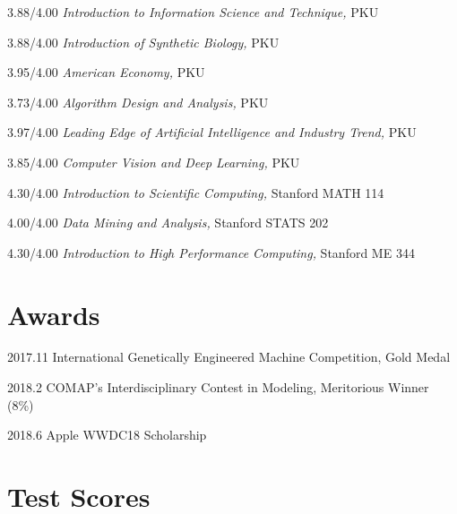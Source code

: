 \documentclass{academiccv}
\begin{document}
\begin{tablist}

\item[3.88/4.00] \tab  \emph{Introduction to Information Science and Technique}\emph, PKU
\item[3.88/4.00] \tab \emph{Introduction of Synthetic Biology}\emph, PKU
\item[3.95/4.00] \tab \emph{American Economy}\emph, PKU
\item[3.73/4.00] \tab \emph{Algorithm Design and Analysis}\emph, PKU
\item[3.97/4.00] \tab  \emph{Leading Edge of Artificial Intelligence and Industry Trend}\emph, PKU
\item[3.85/4.00] \tab \emph{Computer Vision and Deep Learning}\emph, PKU
\item[4.30/4.00] \tab \emph{Introduction to Scientific Computing}\emph, Stanford MATH 114

\item[4.00/4.00] \tab \emph{Data Mining and Analysis}\emph, Stanford STATS 202

\item[4.30/4.00] \tab \emph{Introduction to High Performance Computing}\emph, Stanford ME 344

\end{tablist}


\section*{Awards}

\begin{tablist}
	\item[2017.11] \tab International Genetically Engineered Machine Competition, Gold Medal

	\item[2018.2] \tab COMAP's Interdisciplinary Contest in Modeling, Meritorious Winner (8\%)

	\item[2018.6] \tab Apple WWDC18 Scholarship

	\end{tablist}


\section*{Test Scores}
\end{document}
